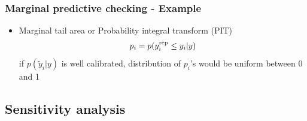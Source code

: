 \documentclass[10pt]{beamer}
\begin{document}
\begin{frame}[fragile]

\frametitle{Marginal predictive checking - Example}

  \begin{itemize}
  \item Marginal tail area or Probability integral transform (PIT)
    \begin{align*}
      p_i = p(y_i^{\operatorname{\mathrm{rep}}} \leq y_i | y)
    \end{align*}
  if $p(\tilde{y}_i|y)$ is well calibrated, distribution of $p_i$'s
    would be uniform between 0 and 1
  \end{itemize}
  \vspace{-1.5\baselineskip}

\end{frame}


\subsection{Sensitivity analysis}
\frame{\subsectionpage}
\end{document}
